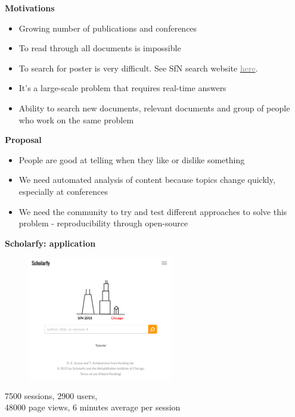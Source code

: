 \begin{frame}{\textbf{Motivations}}

\begin{itemize}
\item Growing number of publications and conferences
\item To read through all documents is impossible
\item To search for poster is very difficult. See SfN search website \href{http://www.abstractsonline.com/plan/BrowseResults.aspx?date=11/15/2014&mkey=\%7B54C85D94-6D69-4B09-AFAA-502C0E680CA7\%7D}{\textcolor{gray}{here}}.
\item It's a large-scale problem that requires real-time answers
\item Ability to search new documents, relevant documents and group of people who work on the same problem
\end{itemize}

\end{frame}


\begin{frame}{\textbf{Proposal}}

\begin{itemize}
\item People are good at telling when they like or dislike something
\item We need automated analysis of content because topics change quickly, especially at conferences
\item We need the community to try and test different approaches to solve this problem - reproducibility through open-source
\end{itemize}

\end{frame}


\begin{frame}{\textbf{Scholarfy: application}}

\begin{figure}
\href{http://www.scholarfy.net}{\includegraphics[width=2.5in]{images/scholarfy}}\\
\end{figure}

7500 sessions, 2900 users, \\
48000 page views, 6 minutes average per session

\end{frame}


